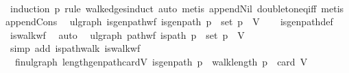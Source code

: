 \begin{isabellebody}
%
\isadelimproof
\ \ %
\endisadelimproof
%
\isatagproof
{}\isamarkupfalse%
\ {\isacharparenleft}{\kern0pt}induction\ p\ rule{\isacharcolon}{\kern0pt}\ walk{\isacharunderscore}{\kern0pt}edges{\isachardot}{\kern0pt}induct{\isacharparenright}{\kern0pt}\ {\isacharparenleft}{\kern0pt}auto{\isacharcomma}{\kern0pt}\ metis\ append{\isacharunderscore}{\kern0pt}Nil\ doubleton{\isacharunderscore}{\kern0pt}eq{\isacharunderscore}{\kern0pt}iff{\isacharcomma}{\kern0pt}\ {\isacharparenleft}{\kern0pt}metis\ append{\isacharunderscore}{\kern0pt}Cons{\isacharparenright}{\kern0pt}{\isacharplus}{\kern0pt}{\isacharparenright}{\kern0pt}%
\endisatagproof
{\isafoldproof}%
%
\isadelimproof
%
\endisadelimproof
%
\isadelimdocument
%
\endisadelimdocument
%
\isatagdocument
%
\isamarkuptrue%
%
\endisatagdocument
{\isafolddocument}%
%
\isadelimdocument
%
\endisadelimdocument
{}\isamarkupfalse%
\ {\isacharparenleft}{\kern0pt}\ ulgraph{\isacharparenright}{\kern0pt}\ is{\isacharunderscore}{\kern0pt}gen{\isacharunderscore}{\kern0pt}path{\isacharunderscore}{\kern0pt}wf{\isacharcolon}{\kern0pt}\ {\isachardoublequoteopen}is{\isacharunderscore}{\kern0pt}gen{\isacharunderscore}{\kern0pt}path\ p\ {\isasymLongrightarrow}\ set\ p\ {\isasymsubseteq}\ V{\isachardoublequoteclose}\isanewline
%
\isadelimproof
\ \ %
\endisadelimproof
%
\isatagproof
{}\isamarkupfalse%
\ is{\isacharunderscore}{\kern0pt}gen{\isacharunderscore}{\kern0pt}path{\isacharunderscore}{\kern0pt}def\ \isamarkupfalse%
\ is{\isacharunderscore}{\kern0pt}walk{\isacharunderscore}{\kern0pt}wf\ \isamarkupfalse%
\ auto%
\endisatagproof
{\isafoldproof}%
%
\isadelimproof
\isanewline
%
\endisadelimproof
\isanewline
{}\isamarkupfalse%
\ {\isacharparenleft}{\kern0pt}\ ulgraph{\isacharparenright}{\kern0pt}\ path{\isacharunderscore}{\kern0pt}wf{\isacharcolon}{\kern0pt}\ {\isachardoublequoteopen}is{\isacharunderscore}{\kern0pt}path\ p\ {\isasymLongrightarrow}\ set\ p\ {\isasymsubseteq}\ V{\isachardoublequoteclose}\isanewline
%
\isadelimproof
\ \ %
\endisadelimproof
%
\isatagproof
{}\isamarkupfalse%
\ {\isacharparenleft}{\kern0pt}simp\ add{\isacharcolon}{\kern0pt}\ is{\isacharunderscore}{\kern0pt}path{\isacharunderscore}{\kern0pt}walk\ is{\isacharunderscore}{\kern0pt}walk{\isacharunderscore}{\kern0pt}wf{\isacharparenright}{\kern0pt}%
\endisatagproof
{\isafoldproof}%
%
\isadelimproof
\isanewline
%
\endisadelimproof
\isanewline
{}\isamarkupfalse%
\ {\isacharparenleft}{\kern0pt}\ fin{\isacharunderscore}{\kern0pt}ulgraph{\isacharparenright}{\kern0pt}\ length{\isacharunderscore}{\kern0pt}gen{\isacharunderscore}{\kern0pt}path{\isacharunderscore}{\kern0pt}card{\isacharunderscore}{\kern0pt}V{\isacharcolon}{\kern0pt}\ {\isachardoublequoteopen}is{\isacharunderscore}{\kern0pt}gen{\isacharunderscore}{\kern0pt}path\ p\ {\isasymLongrightarrow}\ walk{\isacharunderscore}{\kern0pt}length\ p\ {\isasymle}\ card\ V{\isachardoublequoteclose}\isanewline

\end{isabellebody}
